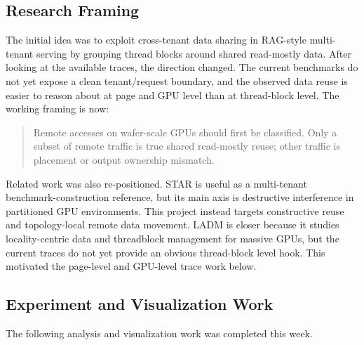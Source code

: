 \documentclass[sigconf,screen,review,anonymous]{acmart}
\begin{document}
\subsection{Research Framing}

The initial idea was to exploit cross-tenant data sharing in RAG-style
multi-tenant serving by grouping thread blocks around shared read-mostly data.
After looking at the available traces, the direction changed.  The current
benchmarks do not yet expose a clean tenant/request boundary, and the observed
data reuse is easier to reason about at page and GPU level than at thread-block
level.  The working framing is now:

\begin{quote}
Remote accesses on wafer-scale GPUs should first be classified.  Only a subset
of remote traffic is true shared read-mostly reuse; other traffic is placement
or output ownership mismatch.
\end{quote}

Related work was also re-positioned.  STAR is useful as a multi-tenant
benchmark-construction reference, but its main axis is destructive interference
in partitioned GPU environments.  This project instead targets constructive
reuse and topology-local remote data movement.  LADM is closer because it
studies locality-centric data and threadblock management for massive GPUs, but
the current traces do not yet provide an obvious thread-block level hook.  This
motivated the page-level and GPU-level trace work below.

\subsection{Experiment and Visualization Work}

The following analysis and visualization work was completed this week.
\end{document}
